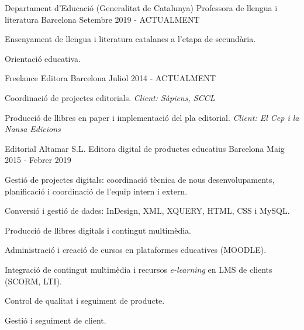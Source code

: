 

\begin{cventries}


  \cventry
    {Departament d'Educació (Generalitat de Catalunya)} %
    {Professora de llengua i literatura} %
    {Barcelona} %
    {Setembre 2019 - ACTUALMENT} %
    {
      \begin{cvitems} %
        \item {Ensenyament de llengua i literatura catalanes a l'etapa de secundària.}
        \item {Orientació educativa.}
      \end{cvitems}
    }

  \cventry
    {Freelance} %
    {Editora} %
    {Barcelona} %
    {Juliol 2014 - ACTUALMENT} %
    {
      \begin{cvitems} %
        \item {Coordinació de projectes editorials. \textit{Client: Sàpiens, SCCL}}
        \item {Producció de llibres en paper i implementació del pla editorial. \textit{Client: El Cep i la Nansa Edicions}}
      \end{cvitems}
    }


  \cventry
    {Editorial Altamar S.L.} %
    {Editora digital de productes educatius} %
    {Barcelona} %
    {Maig 2015 - Febrer 2019} %
    {
      \begin{cvitems} %
        \item {Gestió de projectes digitals: coordinació tècnica de nous desenvolupaments, planificació i coordinació de l'equip intern i extern.}
        \item {Conversió i gestió de dades: InDesign, XML, XQUERY, HTML, CSS i MySQL. }
        \item {Producció de llibres digitals i contingut multimèdia.}
        \item {Administració i creació de cursos en plataformes educatives (MOODLE).}
        \item {Integració de contingut multimèdia i recursos \textit{e-learning} en LMS de clients (SCORM, LTI).}
        \item {Control de qualitat i seguiment de producte.}
        \item {Gestió i seguiment de client.}
      \end{cvitems}
    }


\end{cventries}

